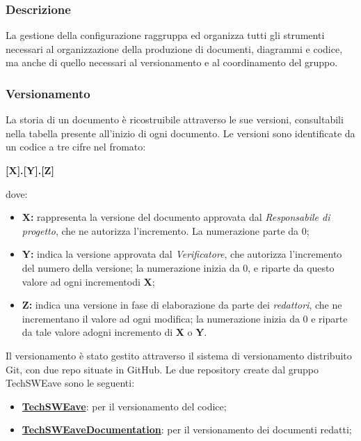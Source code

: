         \subsubsection{Descrizione}
        La gestione della configurazione raggruppa ed organizza tutti gli strumenti necessari al organizzazione della produzione di documenti, diagrammi e codice, ma anche di quello necessari al versionamento e al coordinamento del gruppo.
        \subsubsection{Versionamento}
        La storia di un documento è ricostruibile attraverso le sue versioni, consultabili nella tabella presente all'inizio di ogni documento. Le versioni sono identificate da un codice a tre cifre nel fromato: 
        \begin{center}
            \textbf{\large [X].[Y].[Z]}\\             
        \end{center}
        dove: 
        \begin{itemize}
            \item \textbf{\large X:} rappresenta la versione del documento approvata dal \textit{Responsabile di progetto}, che ne autorizza l'incremento. La numerazione parte da 0;
            \item \textbf{\large Y:} indica la versione approvata dal \textit{Verificatore}, che autorizza l’incremento del numero della versione; la numerazione inizia da 0, e riparte da questo valore ad ogni incrementodi \textbf{X};
            \item \textbf{\large Z:} indica una versione in fase di elaborazione da parte dei \textit{redattori}, che ne incrementano il valore ad ogni modifica; la numerazione inizia da 0 e riparte da tale valore adogni incremento di \textbf{X} o \textbf{Y}.
        \end{itemize}
        Il versionamento è stato gestito attraverso il sistema di versionamento distribuito Git, con due repo situate in GitHub.
        Le due repository create dal gruppo TechSWEave sono le seguenti:
        \begin{itemize}
            \item \textbf{\href{https://github.com/techsweave/TechSWEave.git}{TechSWEave}}: per il versionamento del codice;
            \item \textbf{\href{https://github.com/techsweave/TechSWEaveDocumentation.git}{TechSWEaveDocumentation}}: per il versionamento dei documenti redatti;
        \end{itemize}
